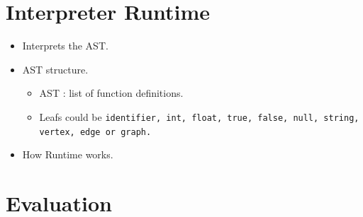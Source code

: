 \documentclass[mathserif,10pt]{beamer}
\newcommand{\cmt}[1]{}
\begin{document}
\section{Interpreter Runtime}
\frame
{
  \begin{itemize}
    \item Interprets the AST.
    \item AST structure.
    \begin{itemize}
      \item   AST : list of function definitions.
      \item  Leafs could be \tt{identifier}, \tt{int}, \tt{float}, \tt{true}, \tt{false}, \tt{null}, \tt{string}, \tt{vertex}, \tt{edge} or \tt{graph}.  
    \end{itemize}
    \item How Runtime works.
  \end{itemize}
    \cmt{
  Our AST is basically a list of function definitions. Each function definition object
contains name of the function, a set of formal arguments and a list of body statements.
These body statements could be an assignment, loop-statement, function call, etc. The
leafs of the AST could be an identifier, int, float, true, false, null, string, vertex, edge or
graph.

The runtime starts with searching for function definition function main(argv) and then
creates a function call out of it and execute it. While creating the function call it uses the
command-line parameters as the actual parameters of the function call.
• The execution of a function call involves finding the corresponding function definition,
checking if the number of formal and actuals are equal and then pushing a call stack frame
( which contains the mapping between the formal and actual values passed to them) in a
global call stack. After that, the function is executed w.r.t the current context(i.e. the top
of the call stack).
• The execution of the function involves executing a list of statements. The statements may
add further mappings in the current call stack frame. Whenever a name (identifier) is
refereed, the mapping in the current context need to be consulted to get the actual value
of it.
    }

}

\section{Evaluation}
\end{document}
